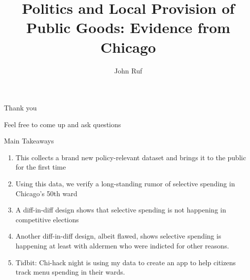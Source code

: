 \documentclass[11pt,notes=hide,aspectratio=169,mathserif]{beamer}
\title{Politics and Local Provision of Public Goods: Evidence from Chicago}
\author[John Ruf]{John Ruf}
\date{\monthname[\the\month] \the\year}
\begin{document}
\begin{frame}[plain]
\titlepage
\note{
	\begin{itemize}
	\end{itemize}
}
\end{frame}







\begin{frame}[plain]
\begin{center}{\LARGE Thank you}\end{center}
\end{frame}

\begin{frame}[plain]
Feel free to come up and ask questions
\begin{center}
	Main Takeaways
\end{center}
\begin{enumerate}
	\item This collects a brand new policy-relevant dataset and brings it to the public for the first time
	\item Using this data, we verify a long-standing rumor of selective spending in Chicago's 50th ward
	\item A diff-in-diff design shows that selective spending is not happening in competitive elections
	\item Another diff-in-diff design, albeit flawed, shows selective spending is happening at least with aldermen who were indicted for other reasons.
	\item Tidbit: Chi-hack night is using my data to create an app to help citizens track menu spending in their wards.
\end{enumerate}

\end{frame}
\end{document}
